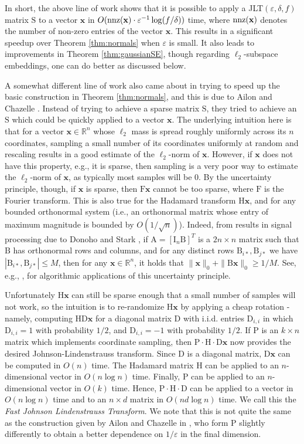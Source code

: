 \documentclass[11pt]{article}
\newcommand{\mat}[1]{{\ensuremath{\bm{\mathrm{#1}}}}}
\def\matA{\mat{A}}
\def\matB{\mat{B}}
\def\matD{\mat{D}}
\def\matF{\mat{F}}
\def\matH{\mat{H}}
\def\matI{\mat{I}}
\def\matP{\mat{P}}
\def\matS{\mat{S}}
\def\nnz{{ \rm nnz }}
\def\x{{\mathbf x}}
\newcommand{\eps}{\varepsilon}
\begin{document}
In short, the above line of work shows that it is possible to apply a JLT$(\eps, \delta, f)$  matrix $\matS$
to a vector $\x$ in $O(\nnz(\x) \cdot \eps^{-1} \log(f/\delta))$ time, where $\nnz(\x)$ denotes the number
of non-zero entries of the vector $\x$. This results in a significant speedup over Theorem \ref{thm:normals}
when $\eps$ is small. It also leads to improvements in Theorem \ref{thm:gaussianSE}, though regarding
$\ell_2$-subspace embeddings, one can do better as discussed below.

A somewhat different line of work also came about in trying to speed up the basic construction
in Theorem \ref{thm:normals}, and this is due to Ailon and Chazelle \cite{AC06}. Instead of trying to achieve
a sparse matrix $\matS$, they tried to achieve an $\matS$ which could be quickly applied to a vector $\x$. 
The underlying
intuition here is that for a vector $\x \in \mathbb{R}^n$ 
whose $\ell_2$ mass is spread roughly uniformly across its $n$ coordinates, sampling a small number of
its coordinates uniformly at random and rescaling results in a good estimate of the $\ell_2$-norm of $\x$. 
However, if $\x$ does not have this property, e.g., it is sparse, then sampling is a very poor way to estimate
the $\ell_2$-norm of $\x$, as typically most samples will be $0$. By the uncertainty principle, though, 
if $\x$ is sparse, then $\matF \x$ cannot be too sparse, 
where $\mat F$ is the Fourier transform. This is also true for the
Hadamard transform $\matH \x$, and for any bounded orthonormal system (i.e., an orthonormal matrix
whose entry of maximum magnitude is bounded by $O(1/\sqrt{n})$). Indeed, from results in signal processing due
to Donoho and Stark \cite{DS89}, 
if $\matA = [\matI_n \matB]^T$ is a $2n \times n$ matrix such that $\matB$ has orthonormal rows and columns,
and for any distinct rows $\matB_{i*}, \matB_{j*}$ we have $|\matB_{i*}, \matB_{j*}| \leq M$, then for any
$\x \in \mathbb{R}^n$, it holds that $\|\x\|_0 + \|\matB \x\|_0 \geq 1/M$. See, e.g., \cite{i07}, 
for algorithmic applications of this uncertainty principle. 

Unfortunately $\matH \x$ can still be sparse enough that a small number of samples will not work, 
so the intuition
is to re-randomize $\matH \x$ by applying a cheap rotation - namely, computing $\matH \matD \x$ 
for a diagonal matrix $\matD$
with i.i.d. entries $\matD_{i,i}$ in which $\matD_{i,i} = 1$ with probability $1/2$, 
and $\matD_{i,i} = -1$ with probability $1/2$.
If $\matP$ is an $k \times n$ matrix which implements coordinate sampling, 
then $\matP \cdot \matH \cdot \matD \x$ now provides the desired
Johnson-Lindenstrauss transform. Since $\matD$ is a diagonal matrix, 
$\matD \x$ can be computed in $O(n)$ time. The Hadamard
matrix $\matH$ can be applied to an $n$-dimensional vector in $O(n \log n)$ time. Finally, $\matP$ can be applied to
an $n$-dimensional vector in $O(k)$ time. Hence, $\matP \cdot \matH \cdot \matD$ 
can be applied to a vector in $O(n \log n)$
time and to an $n \times d$ matrix in $O(n d \log n)$ time. 
We call this the {\em Fast Johnson Lindenstrauss Transform}. We note that this is not
quite the same as the construction given by Ailon and Chazelle in \cite{AC06}, who form $\matP$
slightly differently to obtain a better dependence on $1/\eps$ in the final dimension. 
\end{document}
